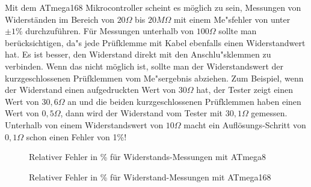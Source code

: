 Mit dem ATmega168 Mikrocontroller scheint es m\"oglich zu sein, Messungen von Widerst\"anden im
Bereich von \(20\Omega\) bis \(20M\Omega\) mit einem Me"sfehler von unter \(\pm1\%\) durchzuf\"uhren.
F\"ur Messungen unterhalb von \(100\Omega\) sollte man ber\"ucksichtigen, da"s jede Pr\"ufklemme mit Kabel ebenfalls
einen Widerstandwert hat.
Es ist besser, den Widerstand direkt mit den Anschlu"sklemmen zu verbinden.
Wenn das nicht m\"oglich ist, sollte man der Widerstandswert der kurzgeschlossenen Pr\"ufklemmen vom Me"sergebnis abziehen.
Zum Beispiel, wenn der Widerstand einen aufgedruckten Wert von \(30\Omega\) hat, der Tester zeigt
einen Wert von \(30,6\Omega\) an
und die beiden kurzgeschlossenen Pr\"ufklemmen haben einen Wert von \(0,5\Omega\), dann wird der Widerstand vom
Tester mit \(30,1\Omega\) gemessen.
Unterhalb von einem Widerstandswert von \(10\Omega\) macht ein Aufl\"osungs-Schritt von \(0,1\Omega\) schon einen Fehler von 1\%!

\begin{figure}[H]
\centering

\caption{Relativer Fehler in \% f\"ur Widerstands-Messungen mit ATmega8 }
\label{fig:mega8res}
\end{figure}

\begin{figure}[H]
\centering

\caption{Relativer Fehler in \% f\"ur Widerstand-Messungen mit ATmega168 }
\label{fig:mega168res}
\end{figure}
